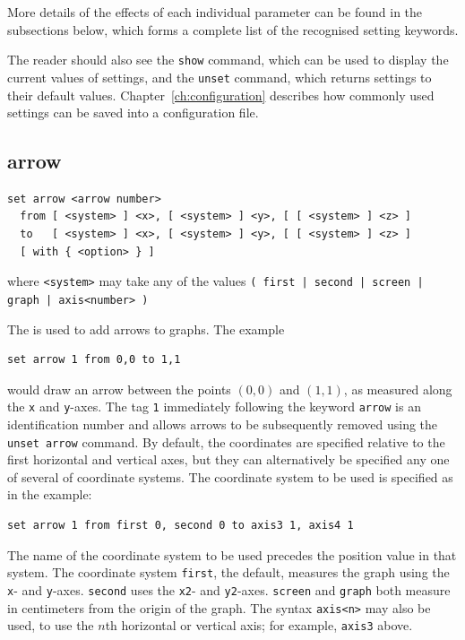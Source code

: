 \noindent
More details of the effects of each individual parameter can be found in the
subsections below, which forms a complete list of the recognised setting
keywords.

The reader should also see the {\tt show} command, which can be used to display
the current values of settings, and the {\tt unset} command, which returns
settings to their default values. Chapter~\ref{ch:configuration} describes how
commonly used settings can be saved into a configuration file.


\subsection{arrow}

\begin{verbatim}
set arrow <arrow number>
  from [ <system> ] <x>, [ <system> ] <y>, [ [ <system> ] <z> ]
  to   [ <system> ] <x>, [ <system> ] <y>, [ [ <system> ] <z> ]
  [ with { <option> } ]
\end{verbatim}

\noindent where {\tt <system>} may take any of the values
\newline\noindent
{\tt ( first | second | screen | graph | axis<number> )}
\vspace{5mm}

The  is used to add arrows to graphs. The example

\begin{verbatim}
set arrow 1 from 0,0 to 1,1
\end{verbatim}

\noindent would draw an arrow between the points $(0,0)$ and $(1,1)$, as
measured along the {\tt x} and {\tt y}-axes.  The tag {\tt 1} immediately
following the keyword {\tt arrow} is an identification number and allows arrows
to be subsequently removed using the {\tt unset arrow} command.  By default,
the coordinates are specified relative to the first horizontal and vertical
axes, but they can alternatively be specified any one of several of coordinate
systems. The coordinate system to be used is specified as in the example:

\begin{verbatim}
set arrow 1 from first 0, second 0 to axis3 1, axis4 1
\end{verbatim}

\noindent The name of the coordinate system to be used precedes the position
value in that system. The coordinate system {\tt first}, the default, measures
the graph using the {\tt x}- and {\tt y}-axes. {\tt second} uses the {\tt x2}-
and {\tt y2}-axes.  {\tt screen} and {\tt graph} both measure in centimeters
from the origin of the graph.  The syntax {\tt axis<n>} may also be used, to
use the $n$th horizontal or vertical axis; for example, {\tt axis3} above.

